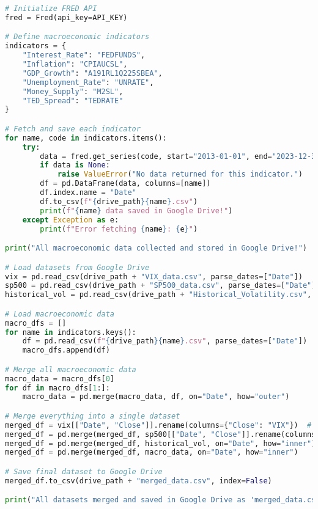 \begin{lstlisting}[language=Python, caption=Data Collection]
# Initialize FRED API
fred = Fred(api_key=API_KEY)

# Define macroeconomic indicators
indicators = {
    "Interest_Rate": "FEDFUNDS",
    "Inflation": "CPIAUCSL",
    "GDP_Growth": "A191RL1Q225SBEA",
    "Unemployment_Rate": "UNRATE",
    "Money_Supply": "M2SL",
    "TED_Spread": "TEDRATE"
}

# Fetch and save each indicator
for name, code in indicators.items():
    try:
        data = fred.get_series(code, start="2013-01-01", end="2023-12-31")
        if data is None:
            raise ValueError("No data returned for this indicator.")
        df = pd.DataFrame(data, columns=[name])
        df.index.name = "Date"
        df.to_csv(f"{drive_path}{name}.csv")
        print(f"{name} data saved in Google Drive!")
    except Exception as e:
        print(f"Error fetching {name}: {e}")

print("All macroeconomic data collected and stored in Google Drive!")

# Load datasets from Google Drive
vix = pd.read_csv(drive_path + "VIX_data.csv", parse_dates=["Date"])
sp500 = pd.read_csv(drive_path + "SP500_data.csv", parse_dates=["Date"])
historical_vol = pd.read_csv(drive_path + "Historical_Volatility.csv", parse_dates=["Date"])

# Load macroeconomic data
macro_dfs = []
for name in indicators.keys():
    df = pd.read_csv(f"{drive_path}{name}.csv", parse_dates=["Date"])
    macro_dfs.append(df)

# Merge all macroeconomic data
macro_data = macro_dfs[0]
for df in macro_dfs[1:]:
    macro_data = pd.merge(macro_data, df, on="Date", how="outer")

# Merge everything into a single dataset
merged_df = vix[["Date", "Close"]].rename(columns={"Close": "VIX"})  # Using "Close" instead of "Adj Close"
merged_df = pd.merge(merged_df, sp500[["Date", "Close"]].rename(columns={"Close": "S&P500"}), on="Date", how="inner")
merged_df = pd.merge(merged_df, historical_vol, on="Date", how="inner")
merged_df = pd.merge(merged_df, macro_data, on="Date", how="inner")

# Save final dataset to Google Drive
merged_df.to_csv(drive_path + "merged_data.csv", index=False)

print("All datasets merged and saved in Google Drive as 'merged_data.csv'!")

\end{lstlisting}

